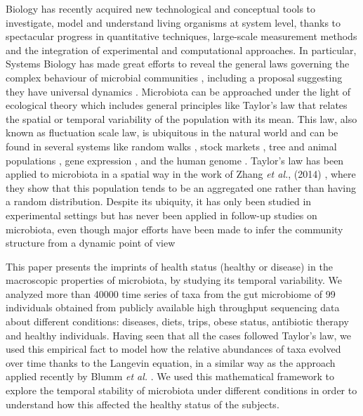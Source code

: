 Biology has recently acquired new technological and conceptual tools to investigate, model and understand living organisms at system level, thanks to spectacular progress in quantitative techniques, large-scale measurement methods and the integration of experimental and computational approaches. In particular, Systems Biology has made great efforts to reveal the general laws governing the complex behaviour of microbial communities \cite{sysbio&microb, msys1, metasysbio}, including a proposal suggesting they have universal dynamics \cite{uni_dynam}. Microbiota can be approached under the light of ecological theory which includes general principles like Taylor's law \cite{pretaylor,taylor} that relates the spatial or temporal variability of the population with its mean. This law, also known as fluctuation scale law, is ubiquitous in the natural world and can be found in several systems like random walks \cite{randomwalks}, stock markets \cite{economics1, economics2}, tree \cite{cohen_taylor} and animal populations \cite{taylor, animal1, animal2}, gene expression \cite{genexpress}, and the human genome \cite{genome}. Taylor's law has been applied to microbiota in a spatial way in the work of Zhang {\it et al.}, (2014) \cite{isme1}, where they show that this population tends to be an aggregated one rather than having a random distribution. Despite its ubiquity, it has only been studied in experimental settings \cite{cohen_bac, ramslayer} but has never been applied in follow-up studies on microbiota, even though major efforts have been made to infer the community structure from a dynamic point of view \cite{cobas, schloss, ravel}  

This paper presents the imprints of health status (healthy or disease) in the macroscopic properties of microbiota, by studying its temporal variability. We analyzed more than 40000 time series of taxa from the gut microbiome of 99 individuals obtained from publicly available high throughput sequencing data about different conditions: diseases, diets, trips, obese status, antibiotic therapy and healthy individuals. Having seen that all the cases followed Taylor's law, we used this empirical fact to model how the relative abundances of taxa evolved over time thanks to the Langevin equation, in a similar way as the approach applied recently by Blumm {\it et al.} \cite{ranking}. We used this mathematical framework to explore the temporal stability of microbiota under different conditions in order to understand how this affected the healthy status of the subjects.